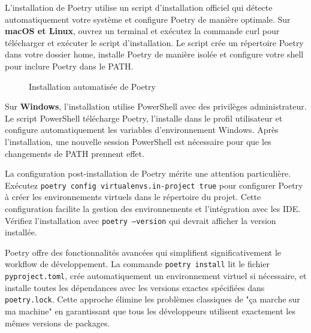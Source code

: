 L'installation de Poetry utilise un script d'installation officiel qui détecte automatiquement votre système et configure Poetry de manière optimale. Sur \textbf{macOS et Linux}, ouvrez un terminal et exécutez la commande curl pour télécharger et exécuter le script d'installation. Le script crée un répertoire Poetry dans votre dossier home, installe Poetry de manière isolée et configure votre shell pour inclure Poetry dans le PATH.

\begin{figure}[h]
\centering
{}
\caption{Installation automatisée de Poetry}
\end{figure}

Sur \textbf{Windows}, l'installation utilise PowerShell avec des privilèges administrateur. Le script PowerShell télécharge Poetry, l'installe dans le profil utilisateur et configure automatiquement les variables d'environnement Windows. Après l'installation, une nouvelle session PowerShell est nécessaire pour que les changements de PATH prennent effet.

La configuration post-installation de Poetry mérite une attention particulière. Exécutez \texttt{poetry config virtualenvs.in-project true} pour configurer Poetry à créer les environnements virtuels dans le répertoire du projet. Cette configuration facilite la gestion des environnements et l'intégration avec les IDE. Vérifiez l'installation avec \texttt{poetry --version} qui devrait afficher la version installée.

Poetry offre des fonctionnalités avancées qui simplifient significativement le workflow de développement. La commande \texttt{poetry install} lit le fichier \texttt{pyproject.toml}, crée automatiquement un environnement virtuel si nécessaire, et installe toutes les dépendances avec les versions exactes spécifiées dans \texttt{poetry.lock}. Cette approche élimine les problèmes classiques de "ça marche sur ma machine" en garantissant que tous les développeurs utilisent exactement les mêmes versions de packages.

